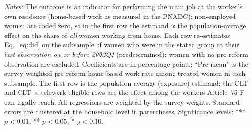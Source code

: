 \begin{table}[H]\centering
\caption{Home-Based Work by Predetermined Subsample: Population-Average versus Legally-Covered Estimands}
\label{tab:estimands}\small
{}
\par\vspace{3pt}\footnotesize\raggedright \textit{Notes:} The outcome is an indicator for performing the main job at the worker's own residence (home-based work as measured in the PNADC); non-employed women are coded zero, so in the first row the estimand is the population-average effect on the share of \emph{all} women working from home. Each row re-estimates Eq.~\eqref{eq:did} on the subsample of women who were in the stated group at their \emph{last observation on or before 2022Q1} (predetermined); women with no pre-reform observation are excluded. Coefficients are in percentage points; ``Pre-mean'' is the survey-weighted pre-reform home-based-work rate among treated women in each subsample. The first row is the population-average (exposure) estimand; the CLT and CLT $\times$ telework-eligible rows are the effect among the workers Article~75-F can legally reach. All regressions are weighted by the survey weights. Standard errors are clustered at the household level in parentheses. Significance levels: *** $p<0.01$, ** $p<0.05$, * $p<0.10$.
\end{table}
